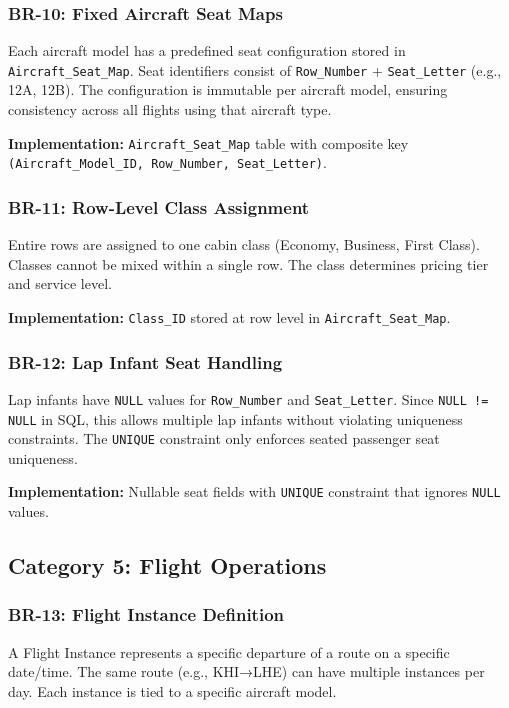 \documentclass[12pt,a4paper,openany]{report}
\begin{document}
\subsubsection{BR-10: Fixed Aircraft Seat Maps}
Each aircraft model has a predefined seat configuration stored in \texttt{Aircraft\_Seat\_Map}. Seat identifiers consist of \texttt{Row\_Number} + \texttt{Seat\_Letter} (e.g., 12A, 12B). The configuration is immutable per aircraft model, ensuring consistency across all flights using that aircraft type.

\textbf{Implementation:} \texttt{Aircraft\_Seat\_Map} table with composite key \texttt{(Aircraft\_Model\_ID, Row\_Number, Seat\_Letter)}.

\subsubsection{BR-11: Row-Level Class Assignment}
Entire rows are assigned to one cabin class (Economy, Business, First Class). Classes cannot be mixed within a single row. The class determines pricing tier and service level.

\textbf{Implementation:} \texttt{Class\_ID} stored at row level in \texttt{Aircraft\_Seat\_Map}.

\subsubsection{BR-12: Lap Infant Seat Handling}
Lap infants have \texttt{NULL} values for \texttt{Row\_Number} and \texttt{Seat\_Letter}. Since \texttt{NULL != NULL} in SQL, this allows multiple lap infants without violating uniqueness constraints. The \texttt{UNIQUE} constraint only enforces seated passenger seat uniqueness.

\textbf{Implementation:} Nullable seat fields with \texttt{UNIQUE} constraint that ignores \texttt{NULL} values.

\subsection{Category 5: Flight Operations}

\subsubsection{BR-13: Flight Instance Definition}
A Flight Instance represents a specific departure of a route on a specific date/time. The same route (e.g., KHI→LHE) can have multiple instances per day. Each instance is tied to a specific aircraft model.
\end{document}
